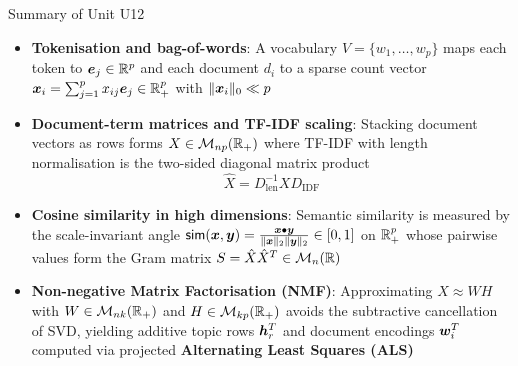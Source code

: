 \documentclass[aspectratio=169]{beamer}\usepackage[]{graphicx}\usepackage[]{xcolor}
\begin{document}
\begin{frame}{Summary of Unit U12}
\begin{itemize}
\item \textbf{Tokenisation and bag-of-words}: A vocabulary $V = \{w_1, \ldots, w_p\}$ maps each token to $\bm{e}_j \in \mathbb{R}^p$ and each document $d_i$ to a sparse count vector $\bm{x}_i = \sum_{j=1}^p x_{ij} \bm{e}_j \in \mathbb{R}_+^p$ with $\|\bm{x}_i\|_0 \ll p$
\vfill
\item \textbf{Document-term matrices and TF-IDF scaling}: Stacking document vectors as rows forms $X \in \mathcal{M}_{np}(\mathbb{R}_+)$ where TF-IDF with length normalisation is the two-sided diagonal matrix product
\[
\hat{X} = D_{\text{len}}^{-1} X D_{\text{IDF}}
\]
\vfill
\item \textbf{Cosine similarity in high dimensions}: Semantic similarity is measured by the scale-invariant angle $\mathsf{sim}(\bm{x}, \bm{y}) = \frac{\bm{x} \bullet \bm{y}}{\|\bm{x}\|_2 \|\bm{y}\|_2} \in [0, 1]$ on $\mathbb{R}_+^p$ whose pairwise values form the Gram matrix $S = \hat{X} \hat{X}^T \in \mathcal{M}_n(\mathbb{R})$
\vfill
\item \textbf{Non-negative Matrix Factorisation (NMF)}: Approximating $X \approx W H$ with $W \in \mathcal{M}_{nk}(\mathbb{R}_+)$ and $H \in \mathcal{M}_{kp}(\mathbb{R}_+)$ avoids the subtractive cancellation of SVD, yielding additive topic rows $\bm{h}_r^T$ and document encodings $\bm{w}_i^T$ computed via projected \textbf{Alternating Least Squares (ALS)}
\end{itemize}
\end{frame}
\end{document}
